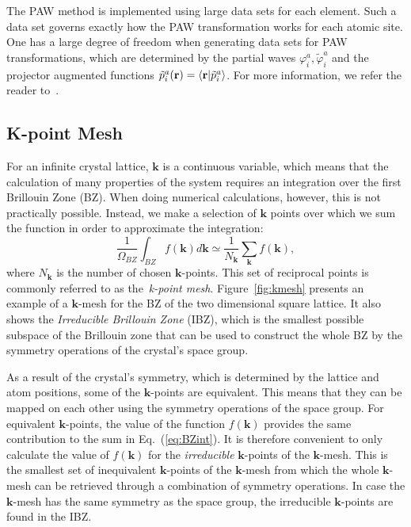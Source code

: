 \begin{refsection}
The PAW method is implemented using large data sets for each element. Such a data set governs exactly how the PAW transformation works for each atomic site. One has a large degree of freedom when generating data sets for PAW transformations, which are determined by the partial waves $\varphi_i^a,\tilde{\varphi}_i^a$ and the projector augmented functions $\tilde{p}_i^a(\mathbf{r}) = \braket{\mathbf{r} |\tilde{p}_i^a}$. For more information, we refer the reader to~\cite{Rostgaard2009}.

\subsection{K-point Mesh} \label{dft:sec-kpoints}

For an infinite crystal lattice, $\mathbf{k}$ is a continuous variable, which means that the calculation of many properties of the system requires an integration over the first Brillouin Zone (BZ). When doing numerical calculations, however, this is not practically possible. Instead, we make a selection of $\mathbf{k}$ points over which we sum the function in order to approximate the integration:
\begin{equation}\label{eq:BZint}
\frac{1}{\Omega_{BZ}}\int_{BZ} f(\mathbf{k}) d\mathbf{k} \simeq \frac{1}{N_\mathbf{k}} \sum_\mathbf{k} f(\mathbf{k}),
\end{equation}
where $N_\mathbf{k}$ is the number of chosen $\mathbf{k}$-points. This set of reciprocal points is commonly referred to as the~\textit{k-point mesh}. Figure~\ref{fig:kmesh} presents an example of a $\mathbf{k}$-mesh for the BZ of the two dimensional square lattice. It also shows the \textit{Irreducible Brillouin Zone} (IBZ), which is the smallest possible subspace of the Brillouin zone that can be used to construct the whole BZ by the symmetry operations of the crystal's space group. 

As a result of the crystal's symmetry, which is determined by the lattice and atom positions, some of the $\mathbf{k}$-points are equivalent. This means that they can be mapped on each other using the symmetry operations of the space group. For equivalent $\mathbf{k}$-points, the value of the function $f(\mathbf{k})$ provides the same contribution to the sum in Eq.~(\ref{eq:BZint}). It is therefore convenient to only calculate the value of $f(\mathbf{k})$ for the \textit{irreducible} $\mathbf{k}$-points of the $\mathbf{k}$-mesh. This is the smallest set of inequivalent $\mathbf{k}$-points of the $\mathbf{k}$-mesh from which the whole $\mathbf{k}$-mesh can be retrieved through a combination of symmetry operations. In case the $\mathbf{k}$-mesh has the same symmetry as the space group, the irreducible $\mathbf{k}$-points are found in the IBZ.


\end{refsection}
